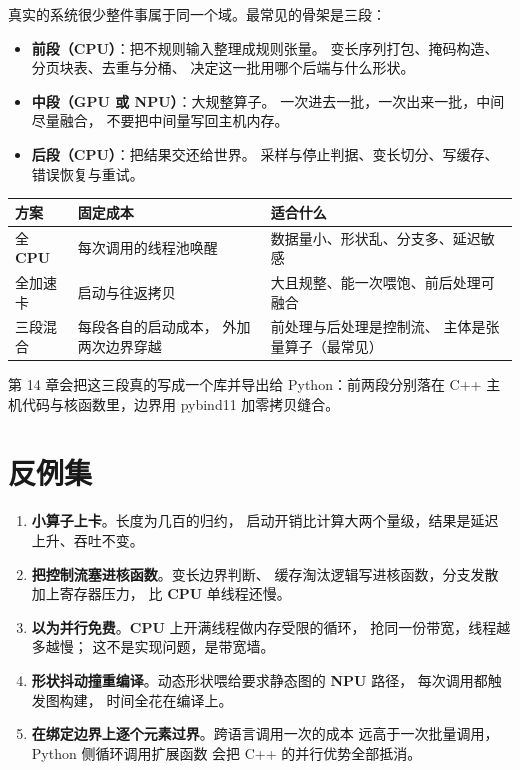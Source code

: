 \documentclass[12pt,a4paper,fontset=fandol]{ctexbook}
\newcommand{\cpp}[1]{C++#1}
\newcommand{\Dom}[1]{\textsf{\bfseries #1}}
\newcommand{\CPU}{\Dom{CPU}}
\newcommand{\GPU}{\Dom{GPU}}
\newcommand{\NPU}{\Dom{NPU}}
\begin{document}
真实的系统很少整件事属于同一个域。最常见的骨架是三段：

\begin{itemize}
  \item \textbf{前段（\CPU{}）}：把不规则输入整理成规则张量。
        变长序列打包、掩码构造、分页块表、去重与分桶、
        决定这一批用哪个后端与什么形状。
  \item \textbf{中段（\GPU{} 或 \NPU{}）}：大规整算子。
        一次进去一批，一次出来一批，中间尽量融合，
        不要把中间量写回主机内存。
  \item \textbf{后段（\CPU{}）}：把结果交还给世界。
        采样与停止判据、变长切分、写缓存、错误恢复与重试。
\end{itemize}

\begin{compare}[title={同一条流水的三种放置的成本结构}]
\begin{tabular}{@{}>{\raggedright\arraybackslash}p{}
  >{\raggedright\arraybackslash}p{}
  >{\raggedright\arraybackslash}p{}@{}}
\toprule
方案 & 固定成本 & 适合什么 \\
\midrule
全 \CPU{} & 每次调用的线程池唤醒 &
  数据量小、形状乱、分支多、延迟敏感 \\
全加速卡 & 启动与往返拷贝 &
  大且规整、能一次喂饱、前后处理可融合 \\
三段混合 & 每段各自的启动成本，
  外加两次边界穿越 & 前处理与后处理是控制流、
  主体是张量算子（最常见） \\
\bottomrule
\end{tabular}
\end{compare}

第 14 章会把这三段真的写成一个库并导出给 Python：前两段分别落在 \cpp{}
主机代码与核函数里，边界用 pybind11 加零拷贝缝合。

\section{反例集}

\begin{warning}[title={五种放错域的典型姿势}]
\begin{enumerate}
  \item \textbf{小算子上卡}。长度为几百的归约，
        启动开销比计算大两个量级，结果是延迟上升、吞吐不变。
  \item \textbf{把控制流塞进核函数}。变长边界判断、
        缓存淘汰逻辑写进核函数，分支发散加上寄存器压力，
        比 \CPU{} 单线程还慢。
  \item \textbf{以为并行免费}。\CPU{} 上开满线程做内存受限的循环，
        抢同一份带宽，线程越多越慢；
        这不是实现问题，是带宽墙。
  \item \textbf{形状抖动撞重编译}。动态形状喂给要求静态图的 \NPU{} 路径，
        每次调用都触发图构建，
        时间全花在编译上。
  \item \textbf{在绑定边界上逐个元素过界}。跨语言调用一次的成本
        远高于一次批量调用，Python 侧循环调用扩展函数
        会把 C++ 的并行优势全部抵消。
\end{enumerate}
\end{warning}
\end{document}
